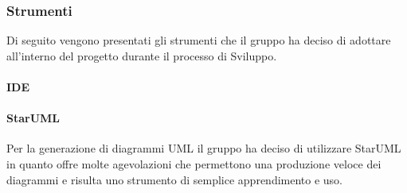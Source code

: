 \subsubsection{Strumenti}
Di seguito vengono presentati gli strumenti che il gruppo ha deciso di adottare all'interno del progetto durante il processo di Sviluppo.
\paragraph{IDE}
\paragraph{StarUML}
Per la generazione di diagrammi UML il gruppo ha deciso di utilizzare StarUML in quanto offre molte agevolazioni che permettono una produzione veloce dei diagrammi e risulta uno strumento di semplice apprendimento e uso.
